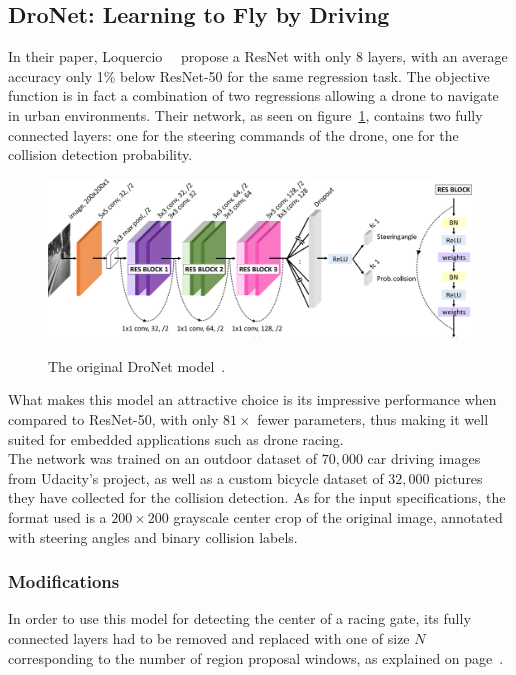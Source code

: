 \subsection{DroNet: Learning to Fly by Driving}

In their paper, Loquercio \etal~\cite{dronet}~propose a ResNet with only 8
layers, with an average accuracy only 1\% below ResNet-50 for the same
regression task. The objective function is in fact a combination of two
regressions allowing a drone to navigate in urban environments. Their network,
as seen on figure~\ref{fig:dronetoriginal}, contains two fully connected
layers: one for the steering commands of the drone, one for the collision
detection probability.

\begin{figure}[h]
	\center
	\includegraphics[width=\textwidth]{figure/dronet.png}
	\label{fig:dronetoriginal}
	\caption{The original DroNet model~\cite{dronet}.}
\end{figure}

What makes this model an attractive choice is its impressive performance when
compared to ResNet-50, with only $81\times$ fewer parameters, thus making it
well suited for embedded applications such as drone racing.\\

The network was trained on an outdoor dataset of $70,000$ car driving images
from Udacity's project, as well as a custom bicycle dataset of $32,000$
pictures they have collected for the collision detection. As for the input
specifications, the format used is a $200\times200$ grayscale center crop of
the original image, annotated with steering angles and binary collision labels.

\subsubsection{Modifications} \label{section:dronet-mods}

In order to use this model for detecting the center of a racing gate, its fully
connected layers had to be removed and replaced with one of size $N$
corresponding to the number of region proposal windows, as explained on
page~\pageref{fig:regionproposal}. 

